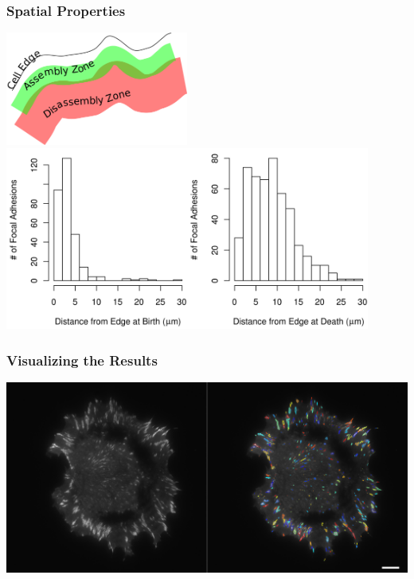 \documentclass{beamer}
\begin{document}
\begin{frame}
	\frametitle{Spatial Properties}
	\begin{center}
	\includegraphics[width=0.45\textwidth]{figures/analysis/spatial_cartoon.png}
	\\
	\includegraphics[width=0.9\textwidth]{figures/analysis/spatial.png}
	\end{center}
\end{frame}

\begin{frame}
	\frametitle{Visualizing the Results}
	\begin{center}
	\includegraphics[width=\textwidth]{figures/analysis/visualize_frame}
	\end{center}
\end{frame}
\end{document}
